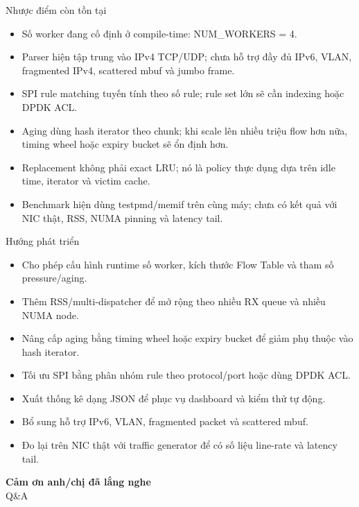 \documentclass[aspectratio=169]{beamer}
\DeclareRobustCommand{\code}[1]{{\scriptsize\ttfamily #1}}
\begin{document}
\begin{frame}{Nhược điểm còn tồn tại}
\small
\begin{itemize}
    \item Số worker đang cố định ở compile-time: \code{NUM\_WORKERS = 4}.
    \item Parser hiện tập trung vào IPv4 TCP/UDP; chưa hỗ trợ đầy đủ IPv6, VLAN, fragmented IPv4, scattered mbuf và jumbo frame.
    \item SPI rule matching tuyến tính theo số rule; rule set lớn sẽ cần indexing hoặc DPDK ACL.
    \item Aging dùng hash iterator theo chunk; khi scale lên nhiều triệu flow hơn nữa, timing wheel hoặc expiry bucket sẽ ổn định hơn.
    \item Replacement không phải exact LRU; nó là policy thực dụng dựa trên idle time, iterator và victim cache.
    \item Benchmark hiện dùng testpmd/memif trên cùng máy; chưa có kết quả với NIC thật, RSS, NUMA pinning và latency tail.
\end{itemize}
\end{frame}

\begin{frame}{Hướng phát triển}
\small
\begin{itemize}
    \item Cho phép cấu hình runtime số worker, kích thước Flow Table và tham số pressure/aging.
    \item Thêm RSS/multi-dispatcher để mở rộng theo nhiều RX queue và nhiều NUMA node.
    \item Nâng cấp aging bằng timing wheel hoặc expiry bucket để giảm phụ thuộc vào hash iterator.
    \item Tối ưu SPI bằng phân nhóm rule theo protocol/port hoặc dùng DPDK ACL.
    \item Xuất thống kê dạng JSON để phục vụ dashboard và kiểm thử tự động.
    \item Bổ sung hỗ trợ IPv6, VLAN, fragmented packet và scattered mbuf.
    \item Đo lại trên NIC thật với traffic generator để có số liệu line-rate và latency tail.
\end{itemize}
\end{frame}

\begin{frame}
\centering
\Huge \textbf{Cảm ơn anh/chị đã lắng nghe}\\
\vspace{0.8cm}
\Large Q\&A
\end{frame}
\end{document}
